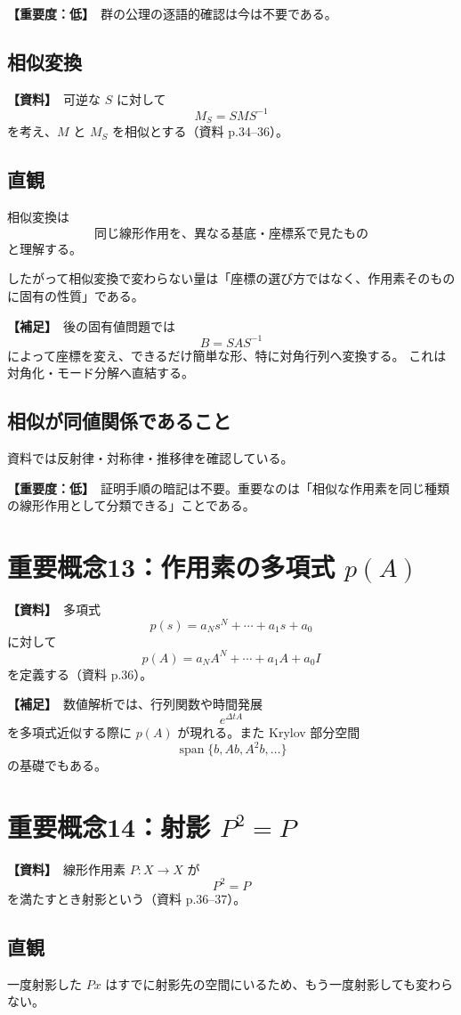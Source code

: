 \documentclass[a4paper,11pt]{ltjsarticle}
\newcommand{\Span}{\operatorname{span}}
\newcommand{\sourceitem}{\textbf{【資料】}}
\newcommand{\suppitem}{\textbf{【補足】}}
\newcommand{\lowimportance}{\textbf{【重要度：低】}}
\begin{document}
\lowimportance\ 群の公理の逐語的確認は今は不要である。

\subsection{相似変換}
\sourceitem\ 可逆な $S$ に対して
\[
\boxed{M_S=SMS^{-1}}
\]
を考え、$M$ と $M_S$ を相似とする（資料 p.34--36）。

\subsection{直観}
相似変換は
\[
\boxed{\text{同じ線形作用を、異なる基底・座標系で見たもの}}
\]
と理解する。

したがって相似変換で変わらない量は「座標の選び方ではなく、作用素そのものに固有の性質」である。

\suppitem\ 後の固有値問題では
\[
B=SAS^{-1}
\]
によって座標を変え、できるだけ簡単な形、特に対角行列へ変換する。
これは対角化・モード分解へ直結する。

\subsection{相似が同値関係であること}
資料では反射律・対称律・推移律を確認している。

\lowimportance\ 証明手順の暗記は不要。重要なのは「相似な作用素を同じ種類の線形作用として分類できる」ことである。

\section{重要概念13：作用素の多項式 $p(A)$}

\sourceitem\ 多項式
\[
p(s)=a_Ns^N+\cdots+a_1s+a_0
\]
に対して
\[
\boxed{
p(A)=a_NA^N+\cdots+a_1A+a_0I
}
\]
を定義する（資料 p.36）。

\suppitem\ 数値解析では、行列関数や時間発展
\[
e^{\Delta tA}
\]
を多項式近似する際に $p(A)$ が現れる。また Krylov 部分空間
\[
\Span\{b,Ab,A^2b,\dots\}
\]
の基礎でもある。

\section{重要概念14：射影 $P^2=P$}

\sourceitem\ 線形作用素 $P:X\to X$ が
\[
\boxed{P^2=P}
\]
を満たすとき射影という（資料 p.36--37）。

\subsection{直観}
一度射影した $Px$ はすでに射影先の空間にいるため、もう一度射影しても変わらない。
\end{document}
